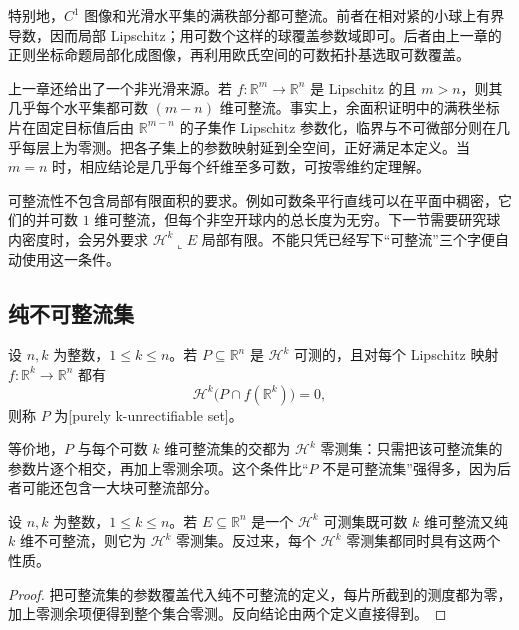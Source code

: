 特别地，\(C^1\) 图像和光滑水平集的满秩部分都可整流。前者在相对紧的小球上有界导数，因而局部 Lipschitz；用可数个这样的球覆盖参数域即可。后者由上一章的正则坐标命题局部化成图像，再利用欧氏空间的可数拓扑基选取可数覆盖。

\ProseParagraphBreak

上一章还给出了一个非光滑来源。若 \(f:\mathbb R^m\to\mathbb R^n\) 是 Lipschitz 的且 \(m>n\)，则其几乎每个水平集都可数 \((m-n)\) 维可整流。事实上，余面积证明中的满秩坐标片在固定目标值后由 \(\mathbb R^{m-n}\) 的子集作 Lipschitz 参数化，临界与不可微部分则在几乎每层上为零测。把各子集上的参数映射延到全空间，正好满足本定义。当 \(m=n\) 时，相应结论是几乎每个纤维至多可数，可按零维约定理解。

\ProseParagraphBreak

可整流性不包含局部有限面积的要求。例如可数条平行直线可以在平面中稠密，它们的并可数 \(1\) 维可整流，但每个非空开球内的总长度为无穷。下一节需要研究球内密度时，会另外要求 \(\mathcal H^k\llcorner E\) 局部有限。不能只凭已经写下“可整流”三个字便自动使用这一条件。

\subsection{纯不可整流集}
\label{b1:subsec:190103}

\begin{definition}\label{b1:def:purely-unrectifiable-set}
设 \(n,k\) 为整数，\(1\leq k\leq n\)。若 \(P\subseteq\mathbb R^n\) 是 \(\mathcal H^k\) 可测的，且对每个 Lipschitz 映射 \(f:\mathbb R^k\to\mathbb R^n\) 都有
\[
 \mathcal H^k\bigl(P\cap f(\mathbb R^k)\bigr)=0,
\]
则称 \(P\) 为[purely k-unrectifiable set]。
\end{definition}

等价地，\(P\) 与每个可数 \(k\) 维可整流集的交都为 \(\mathcal H^k\) 零测集：只需把该可整流集的参数片逐个相交，再加上零测余项。这个条件比“\(P\) 不是可整流集”强得多，因为后者可能还包含一大块可整流部分。

\begin{proposition}\label{b1:prop:rectifiable-pure-zero}
设 \(n,k\) 为整数，\(1\leq k\leq n\)。若 \(E\subseteq\mathbb R^n\) 是一个 \(\mathcal H^k\) 可测集既可数 \(k\) 维可整流又纯 \(k\) 维不可整流，则它为 \(\mathcal H^k\) 零测集。反过来，每个 \(\mathcal H^k\) 零测集都同时具有这两个性质。
\end{proposition}
\begin{proof}
把可整流集的参数覆盖代入纯不可整流的定义，每片所截到的测度都为零，加上零测余项便得到整个集合零测。反向结论由两个定义直接得到。
\end{proof}


